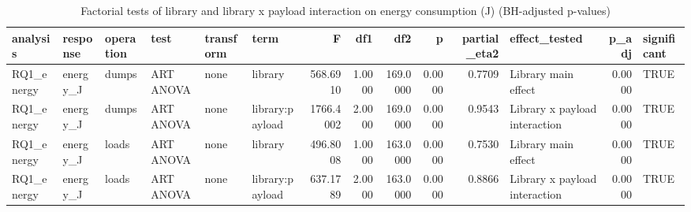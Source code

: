\begin{table}[ht]
\centering
\begin{tabular}{llllllrrrrrlrl}
  \toprule
analysis & response & operation & test & transform & term & F & df1 & df2 & p & partial\_eta2 & effect\_tested & p\_adj & significant \\ 
  \midrule
RQ1\_energy & energy\_J & dumps & ART ANOVA & none & library & 568.6910 & 1.0000 & 169.0000 & 0.0000 & 0.7709 & Library main effect & 0.0000 & TRUE \\ 
  RQ1\_energy & energy\_J & dumps & ART ANOVA & none & library:payload & 1766.4002 & 2.0000 & 169.0000 & 0.0000 & 0.9543 & Library x payload interaction & 0.0000 & TRUE \\ 
  RQ1\_energy & energy\_J & loads & ART ANOVA & none & library & 496.8008 & 1.0000 & 163.0000 & 0.0000 & 0.7530 & Library main effect & 0.0000 & TRUE \\ 
  RQ1\_energy & energy\_J & loads & ART ANOVA & none & library:payload & 637.1789 & 2.0000 & 163.0000 & 0.0000 & 0.8866 & Library x payload interaction & 0.0000 & TRUE \\ 
   \bottomrule
\end{tabular}
\caption{Factorial tests of library and library x payload interaction on energy consumption (J) (BH-adjusted p-values)} 
\label{tab:RQ1_energy_anova}
\end{table}
